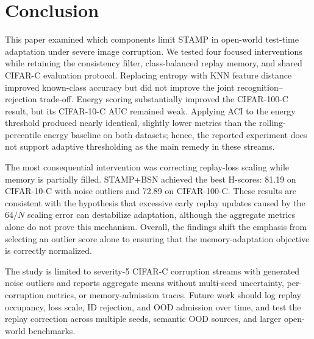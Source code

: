 \section{Conclusion}

This paper examined which components limit STAMP in open-world test-time
adaptation under severe image corruption. We tested four focused interventions
while retaining the consistency filter, class-balanced replay memory, and
shared CIFAR-C evaluation protocol. Replacing entropy with KNN feature distance
improved known-class accuracy but did not improve the joint
recognition--rejection trade-off. Energy scoring substantially improved the
CIFAR-100-C result, but its CIFAR-10-C AUC remained weak. Applying ACI to the
energy threshold produced nearly identical, slightly lower metrics than the
rolling-percentile energy baseline on both datasets; hence, the reported
experiment does not support adaptive thresholding as the main remedy in these
streams.

The most consequential intervention was correcting replay-loss scaling while
memory is partially filled. STAMP+BSN achieved the best H-scores: 81.19 on
CIFAR-10-C with noise outliers and 72.89 on CIFAR-100-C.
These results are consistent with the hypothesis that excessive early replay
updates caused by the $64/N$ scaling error can destabilize adaptation, although
the aggregate metrics alone do not prove this mechanism. Overall, the findings
shift the emphasis from selecting an outlier score alone to ensuring that the
memory-adaptation objective is correctly normalized.

The study is limited to severity-5 CIFAR-C corruption streams with generated
noise outliers and reports aggregate means without multi-seed uncertainty,
per-corruption metrics, or memory-admission traces. Future work should log
replay occupancy, loss scale, ID rejection, and OOD admission over time, and
test the replay correction across multiple seeds, semantic OOD sources, and
larger open-world benchmarks.
